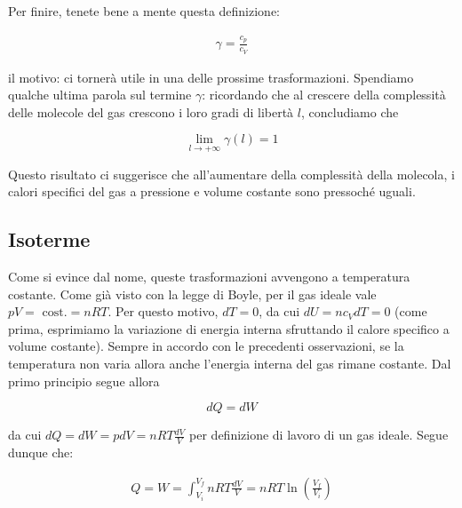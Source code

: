 Per finire, tenete bene a mente questa definizione:

\begin{align}
    \gamma = \frac{c_p}{c_V}\label{gamgam}
\end{align}

\noindent il motivo: ci tornerà utile in una delle prossime trasformazioni.
Spendiamo qualche ultima parola sul termine $\gamma$:
ricordando che al crescere della complessità delle molecole del
gas crescono i loro gradi di libertà $l$, concludiamo che

\[ \lim_{l \to +\infty} \gamma(l) = 1 \]

\noindent Questo risultato ci suggerisce che all'aumentare della
complessità della molecola, i calori specifici del gas a pressione
e volume costante sono pressoché uguali.

\subsection{Isoterme}
Come si evince dal nome, queste trasformazioni avvengono a temperatura
costante. Come già visto con la legge di Boyle, per il gas ideale
vale $pV = \text{ cost.} = nRT$. Per questo motivo, $dT = 0$, da cui
$dU = nc_VdT = 0$ (come prima, esprimiamo la variazione di energia
interna sfruttando il calore specifico a volume costante). Sempre in
accordo con le precedenti osservazioni, se la temperatura non varia
allora anche l'energia interna del gas rimane costante. Dal primo
principio segue allora

\[ dQ = dW \]

\noindent da cui $dQ = dW = pdV = nRT\frac{dV}{V}$ per definizione di lavoro
di un gas ideale. Segue dunque che:

\begin{align}
    Q = W = \int_{V_i}^{V_f}nRT\frac{dV}{V} = nRT\ln\left(\frac{V_f}{V_i}\right)
\end{align}

